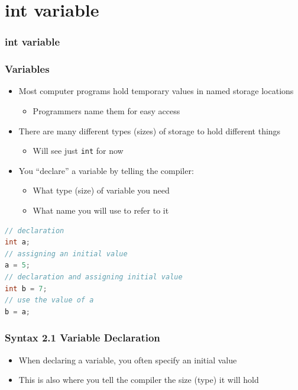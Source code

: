 \documentclass{beamer}
\begin{document}
\section{int variable}

\begin{frame}[t,fragile] \frametitle{int variable} %
\end{frame}

\begin{frame}[t,fragile] \frametitle{Variables} %
    \begin{itemize}
        \item Most computer programs hold temporary values in named storage locations
        \begin{itemize}
            \item Programmers name them for easy access
        \end{itemize}
        \item There are many different types (sizes) of storage to hold different things
        \begin{itemize}
            \item Will see just \texttt{int} for now
        \end{itemize}
        \item You ``declare'' a variable by telling the compiler:
        \begin{itemize}
            \item What type (size) of variable you need
            \item What name you will use to refer to it
        \end{itemize}
    \end{itemize}
\begin{lstlisting}[language=Java]
// declaration
int a;
// assigning an initial value
a = 5;
// declaration and assigning initial value
int b = 7;
// use the value of a
b = a;
\end{lstlisting}
\end{frame}

\begin{frame}[t,fragile] \frametitle{Syntax 2.1 Variable Declaration} %
    \begin{itemize}
        \item When declaring a variable, you often specify an initial value
        \item This is also where you tell the compiler the size (type) it will hold
    \end{itemize}
\end{frame}
\end{document}
